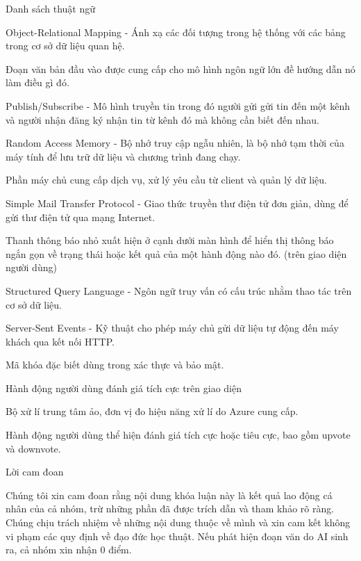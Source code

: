 \documentclass{uetgraduation}
\makeatletter
\newcommand\descriptionlabel[1]{\hspace\labelsep\normalfont\bfseries #1}%
\newenvironment{description}{%
        \list{}{%
            \labelwidth\z@ \itemindent-\leftmargin
            \let\makelabel\descriptionlabel
        }%
    }{\endlist}%
\makeatother
\begin{document}
\begin{contentlisting}
\begin{contentlistingsection}{Danh sách thuật ngữ}
\begin{description}
            \item[ORM] Object-Relational Mapping - Ánh xạ các đối tượng trong hệ thống với các bảng trong cơ sở dữ liệu quan hệ.
            \item[prompt] Đoạn văn bản đầu vào được cung cấp cho mô hình ngôn ngữ lớn đề hướng dẫn nó làm điều gì đó.
            \item[Pub/Sub] Publish/Subscribe - Mô hình truyền tin trong đó người gửi gửi tin đến một kênh và người nhận đăng ký nhận tin từ kênh đó mà không cần biết đến nhau.
            \item[RAM] Random Access Memory - Bộ nhớ truy cập ngẫu nhiên, là bộ nhớ tạm thời của máy tính để lưu trữ dữ liệu và chương trình đang chạy.
            \item[server] Phần máy chủ cung cấp dịch vụ, xử lý yêu cầu từ client và quản lý dữ liệu.
            \item[SMTP] Simple Mail Transfer Protocol - Giao thức truyền thư điện tử đơn giản, dùng để gửi thư điện tử qua mạng Internet.
            \item[snackbar] Thanh thông báo nhỏ xuất hiện ở cạnh dưới màn hình để hiển thị thông báo ngắn gọn về trạng thái hoặc kết quả của một hành động nào đó. (trên giao diện người dùng)
            \item[SQL] Structured Query Language - Ngôn ngữ truy vấn có cấu trúc nhằm thao tác trên cơ sở dữ liệu.
            \item[SSE] Server-Sent Events - Kỹ thuật cho phép máy chủ gửi dữ liệu tự động đến máy khách qua kết nối HTTP.
            \item[token] Mã khóa đặc biết dùng trong xác thực và bảo mật.
            \item[upvote] Hành động người dùng đánh giá tích cực trên giao diện
            \item[vCPU/vCore] Bộ xử lí trung tâm ảo, đơn vị đo hiệu năng xử lí do Azure cung cấp.
            \item[vote] Hành động người dùng thể hiện đánh giá tích cực hoặc tiêu cực, bao gồm upvote và downvote.
        \end{description}
    \end{contentlistingsection}

    \begin{contentlistingsection}{Lời cam đoan}
        {\indent
        Chúng tôi xin cam đoan rằng nội dung khóa luận này là kết quả lao động cá nhân của cả nhóm,
        trừ những phần đã được trích dẫn và tham khảo rõ ràng. Chúng chịu trách nhiệm về
        những nội dung thuộc về mình và xin cam kết không vi phạm các quy định về đạo đức
        học thuật. Nếu phát hiện đoạn văn do AI sinh ra, cả nhóm xin nhận 0 điểm.\par}


\end{contentlistingsection}
\end{contentlisting}
\end{document}
